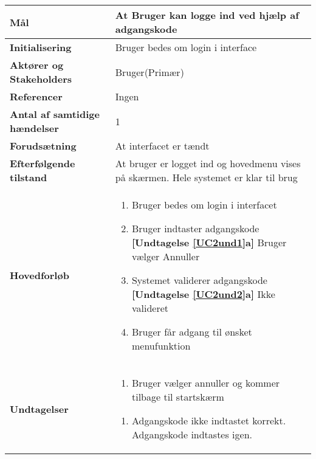 \begin{table}[H] \centering
\begin{tabular}{|p{6cm}|p{8cm}|}
	\hline
\textbf{Mål}								
&At Bruger kan logge ind ved hjælp af adgangskode
 \\\hline
\textbf{Initialisering}					
&Bruger bedes om login i interface
 \\\hline
\textbf{Aktører og Stakeholders}			
&Bruger(Primær)
 \\\hline
\textbf{Referencer}						
&Ingen
 \\\hline
\textbf{Antal af samtidige hændelser}	
&1
 \\\hline
\textbf{Forudsætning}					
&At interfacet er tændt
 \\\hline
\textbf{Efterfølgende tilstand}			
&At bruger er logget ind og hovedmenu vises på skærmen. Hele systemet er klar til brug
 \\\hline
\textbf{Hovedforløb}						
& 
\begin{enumerate}

\item Bruger bedes om login i interfacet

\item \label{UC2und1}Bruger indtaster adgangskode \newline
\textbf{[Undtagelse \ref{UC2und1}a]} Bruger vælger Annuller

\item \label{UC2und2} Systemet validerer adgangskode \newline
\textbf{[Undtagelse \ref{UC2und2}a]} Ikke valideret

\item Bruger får adgang til ønsket menufunktion	
 
\end{enumerate}
\\\hline

\textbf{Undtagelser}						
&\begin{enumerate}[label= \ref{UC8und1}a.]
			\item Bruger vælger annuller og kommer tilbage til startskærm
		\end{enumerate}
											
		\begin{enumerate}[label= \ref{UC8und2}a.]
			\item Adgangskode ikke indtastet korrekt. Adgangskode indtastes igen.
		\end{enumerate} \\\hline


	\end{tabular}
	\label{UC1} 
\end{table}